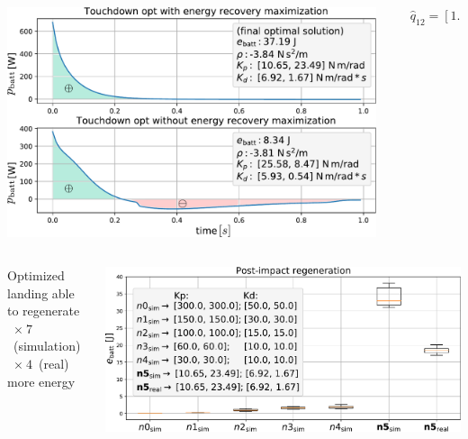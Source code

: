 \begin{Large}
\vskip0.5cm
\begin{columns}[c]
	\begin{column}{0.6\textwidth}
		\includegraphics[width=1.0\textwidth]{docs/imgs/critically_damped_vs_no_reg_pow_max.pdf}
		
	\end{column}
	\begin{column}{0.3\textwidth}
		\begin{align*}
		&\hat{q}_{12} = [1.34~\mathrm{rad},~1.33~\mathrm{rad}]
		\end{align*}
	\end{column}
\end{columns}
\begin{columns}[c]
	\begin{column}{0.25\textwidth}
		Optimized landing able to regenerate\\
		\themarker~$\times~7$~(simulation)\\
		\themarker~$\times~4$~(real) \\
		more energy
	\end{column}
	\begin{column}{0.7\textwidth}
		\includegraphics[width=1.0\textwidth]{docs/imgs/opt_vs_non_opt_conf.pdf}
	\end{column}
\end{columns}
\vskip0.5cm
\end{Large}